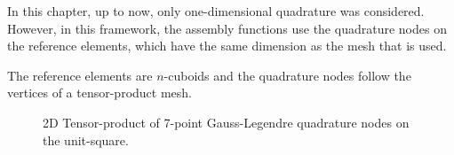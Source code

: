 In this chapter, up to now, only one-dimensional quadrature was considered.
However, in this framework, the assembly functions use the quadrature nodes on the reference elements,
which have the same dimension as the mesh that is used.

The reference elements are $n$-cuboids and the quadrature nodes follow the vertices of a tensor-product mesh.

\begin{figure}[h]
    \centering
    \caption{2D Tensor-product of 7-point Gauss-Legendre quadrature nodes on the unit-square.}
    \label{fig:tensor_prod}
\end{figure}
